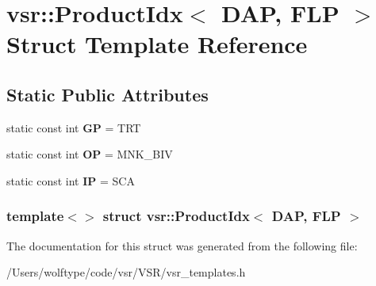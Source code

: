 \hypertarget{structvsr_1_1_product_idx_3_01_d_a_p_00_01_f_l_p_01_4}{\section{vsr\-:\-:Product\-Idx$<$ D\-A\-P, F\-L\-P $>$ Struct Template Reference}
\label{structvsr_1_1_product_idx_3_01_d_a_p_00_01_f_l_p_01_4}
}
\subsection*{Static Public Attributes}
\begin{DoxyCompactItemize}
\item 
\hypertarget{structvsr_1_1_product_idx_3_01_d_a_p_00_01_f_l_p_01_4_ad530b11b3c209c8402f280872ef93dc2}{static const int {\bfseries G\-P} = T\-R\-T}\label{structvsr_1_1_product_idx_3_01_d_a_p_00_01_f_l_p_01_4_ad530b11b3c209c8402f280872ef93dc2}

\item 
\hypertarget{structvsr_1_1_product_idx_3_01_d_a_p_00_01_f_l_p_01_4_ac9a5e099ed5ffa282ca0d4a46fd5cf83}{static const int {\bfseries O\-P} = M\-N\-K\-\_\-\-B\-I\-V}\label{structvsr_1_1_product_idx_3_01_d_a_p_00_01_f_l_p_01_4_ac9a5e099ed5ffa282ca0d4a46fd5cf83}

\item 
\hypertarget{structvsr_1_1_product_idx_3_01_d_a_p_00_01_f_l_p_01_4_a40547ec8c5f01eae25675d49d87bbdfb}{static const int {\bfseries I\-P} = S\-C\-A}\label{structvsr_1_1_product_idx_3_01_d_a_p_00_01_f_l_p_01_4_a40547ec8c5f01eae25675d49d87bbdfb}

\end{DoxyCompactItemize}
\subsubsection*{template$<$$>$ struct vsr\-::\-Product\-Idx$<$ D\-A\-P, F\-L\-P $>$}



The documentation for this struct was generated from the following file\-:\begin{DoxyCompactItemize}
\item 
/\-Users/wolftype/code/vsr/\-V\-S\-R/vsr\-\_\-templates.\-h\end{DoxyCompactItemize}
